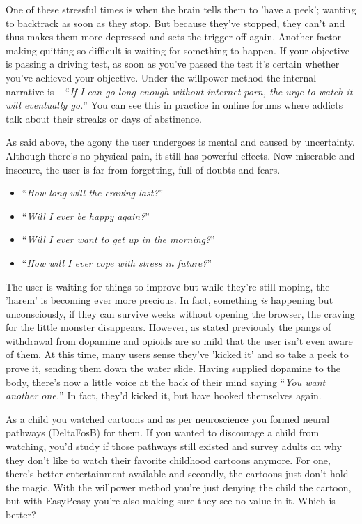 \documentclass[
]{book}
\begin{document}
One of these stressful times is when the brain tells them to 'have a peek'; wanting to backtrack as soon as they stop. But because they've stopped, they can't and thus makes them more depressed and sets the trigger off again. Another factor making quitting so difficult is waiting for something to happen. If your objective is passing a driving test, as soon as you've passed the test it's certain whether you've achieved your objective. Under the willpower method the internal narrative is -- ``\emph{If I can go long enough without internet porn, the urge to watch it will eventually go.}'' You can see this in practice in online forums where addicts talk about their streaks or days of abstinence.

As said above, the agony the user undergoes is mental and caused by uncertainty. Although there's no physical pain, it still has powerful effects. Now miserable and insecure, the user is far from forgetting, full of doubts and fears.

\begin{itemize}
\item
  ``\emph{How long will the craving last?}''
\item
  ``\emph{Will I ever be happy again?}''
\item
  ``\emph{Will I ever want to get up in the morning?}''
\item
  ``\emph{How will I ever cope with stress in future?}''
\end{itemize}

The user is waiting for things to improve but while they're still moping, the 'harem' is becoming ever more precious. In fact, something \emph{is} happening but unconsciously, if they can survive weeks without opening the browser, the craving for the little monster disappears. However, as stated previously the pangs of withdrawal from dopamine and opioids are so mild that the user isn't even aware of them. At this time, many users sense they've 'kicked it' and so take a peek to prove it, sending them down the water slide. Having supplied dopamine to the body, there's now a little voice at the back of their mind saying ``\emph{You want another one.}'' In fact, they'd kicked it, but have hooked themselves again.

As a child you watched cartoons and as per neuroscience you formed neural pathways (DeltaFosB) for them. If you wanted to discourage a child from watching, you'd study if those pathways still existed and survey adults on why they don't like to watch their favorite childhood cartoons anymore. For one, there's better entertainment available and secondly, the cartoons just don't hold the magic. With the willpower method you're just denying the child the cartoon, but with EasyPeasy you're also making sure they see no value in it. Which is better?
\end{document}
